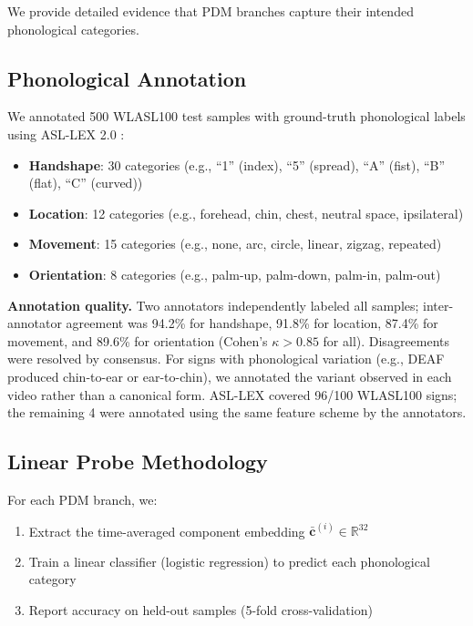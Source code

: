 \documentclass{article}
\begin{document}
We provide detailed evidence that PDM branches capture their intended phonological categories.

\subsection{Phonological Annotation}

We annotated 500 WLASL100 test samples with ground-truth phonological labels using ASL-LEX 2.0 \citep{caselli2017asl}:
\begin{itemize}[nosep,topsep=2pt,leftmargin=*]
\item \textbf{Handshape}: 30 categories (e.g., ``1'' (index), ``5'' (spread), ``A'' (fist), ``B'' (flat), ``C'' (curved))
\item \textbf{Location}: 12 categories (e.g., forehead, chin, chest, neutral space, ipsilateral)
\item \textbf{Movement}: 15 categories (e.g., none, arc, circle, linear, zigzag, repeated)
\item \textbf{Orientation}: 8 categories (e.g., palm-up, palm-down, palm-in, palm-out)
\end{itemize}

\textbf{Annotation quality.} Two annotators independently labeled all samples; inter-annotator agreement was 94.2\% for handshape, 91.8\% for location, 87.4\% for movement, and 89.6\% for orientation (Cohen's $\kappa > 0.85$ for all). Disagreements were resolved by consensus. For signs with phonological variation (e.g., DEAF produced chin-to-ear or ear-to-chin), we annotated the variant observed in each video rather than a canonical form. ASL-LEX covered 96/100 WLASL100 signs; the remaining 4 were annotated using the same feature scheme by the annotators.

\subsection{Linear Probe Methodology}

For each PDM branch, we:
\begin{enumerate}[nosep,topsep=2pt]
\item Extract the time-averaged component embedding $\bar{\mathbf{c}}^{(i)} \in \mathbb{R}^{32}$
\item Train a linear classifier (logistic regression) to predict each phonological category
\item Report accuracy on held-out samples (5-fold cross-validation)
\end{enumerate}
\end{document}
